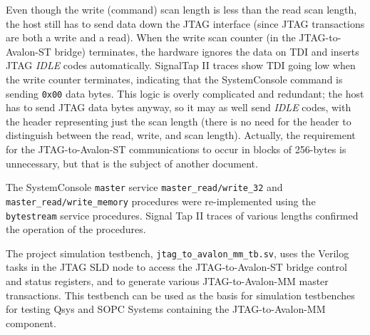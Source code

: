 \documentclass[10pt,twoside]{article}
\begin{document}
\begin{itemize}
Even though the write (command) scan length is less than the
read scan length, the host still has to send data down the JTAG
interface (since JTAG transactions are both a write and a read).
When the write scan counter (in the JTAG-to-Avalon-ST bridge)
terminates, the hardware ignores the data on TDI and inserts 
JTAG {\em IDLE} codes automatically. SignalTap II traces
show TDI going low when the write counter terminates,
indicating that the SystemConsole command is sending \verb+0x00+
data bytes. This logic is overly complicated and redundant;
the host has to send JTAG data bytes anyway, so it may as well send
{\em IDLE} codes, with the header representing just the
scan length (there is no need for the header to distinguish between the
read, write, and scan length). Actually, the requirement for the
JTAG-to-Avalon-ST communications to occur in blocks of 256-bytes
is unnecessary, but that is the subject of another document.

\end{itemize}
%
The SystemConsole \verb+master+ service 
\verb+master_read/write_32+ and \verb+master_read/write_memory+
procedures were re-implemented using the \verb+bytestream+
service procedures. Signal Tap II traces of various 
lengths confirmed the operation of the procedures.

The project simulation testbench, \verb+jtag_to_avalon_mm_tb.sv+,
uses the Verilog tasks in the JTAG SLD node to access the
JTAG-to-Avalon-ST bridge control and status registers,
and to generate various JTAG-to-Avalon-MM master transactions.
This testbench can be used as the basis for simulation testbenches
for testing Qsys and SOPC Systems containing the
JTAG-to-Avalon-MM component.
\end{document}
